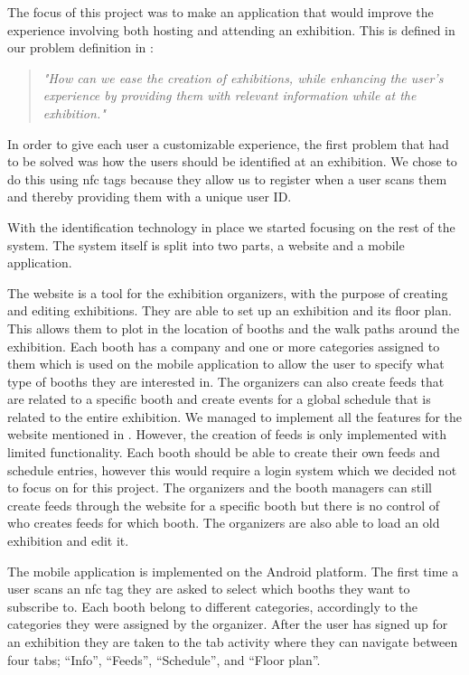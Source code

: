 The focus of this project was to make an application that would improve the experience involving both hosting and attending an exhibition.
This is defined in our problem definition in :
\begin{quote}
\textit{"How can we ease the creation of exhibitions, while enhancing the user's experience by providing them with relevant information while at the exhibition."}
\end{quote}
In order to give each user a customizable experience, the first problem that had to be solved was how the users should be identified at an exhibition. We chose to do this using \ac{nfc} tags because they allow us to register when a user scans them and thereby providing them with a unique user ID.
 
With the identification technology in place we started focusing on the rest of the system. The system itself is split into two parts, a website and a mobile application.

The website is a tool for the exhibition organizers, with the purpose of creating and editing exhibitions. They are able to set up an exhibition and its floor plan. This allows them to plot in the location of booths and the walk paths around the exhibition. Each booth has a company and one or more categories assigned to them which is used on the mobile application to allow the user to specify what type of booths they are interested in. The organizers can also create feeds that are related to a specific booth and create events for a global schedule that is related to the entire exhibition. We managed to implement all the features for the website mentioned in . However, the creation of feeds is only implemented with limited functionality. Each booth should be able to create their own feeds and schedule entries, however this would require a login system which we decided not to focus on for this project. The organizers and the booth managers can still create feeds through the website for a specific booth but there is no control of who creates feeds for which booth. The organizers are also able to load an old exhibition and edit it.

The mobile application is implemented on the Android platform. The first time a user scans an \ac{nfc} tag they are asked to select which booths they want to subscribe to. Each booth belong to different categories, accordingly to the categories they were assigned by the organizer. After the user has signed up for an exhibition they are taken to the tab activity where they can navigate between four tabs; ``Info'', ``Feeds'', ``Schedule'', and ``Floor plan''.

